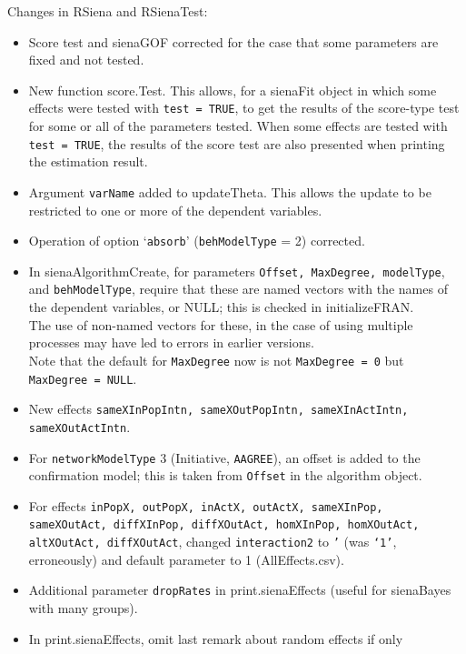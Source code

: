 \documentclass[a4paper,fleqn,11pt]{article}
\newcommand{\+}{\, + \,}
\newcommand{\sfn}[1]{\textsf{#1}}
\begin{document}
\begin{small}
\begin{itemize}
Changes in \textsf{RSiena} and \textsf{RSienaTest}:
\begin{itemize}
 \item Score test and \textsf{sienaGOF} corrected for the case that some parameters
      are fixed and not tested.
 \item New function \sfn{score.Test}. This allows, for a \sfn{sienaFit}
     object in which some effects were tested with \texttt{test = TRUE}, to get the
     results of the score-type test for some or all of the parameters tested.
     When some effects are tested with \texttt{test = TRUE}, the
     results of the score test are also presented when printing the estimation
     result.
 \item Argument \texttt{varName} added to \sfn{updateTheta}.
     This allows the update to be restricted to one or more of the
     dependent variables.
 \item Operation of option `\texttt{absorb}' (\texttt{behModelType} = 2) corrected.
 \item In \textsf{sienaAlgorithmCreate}, for parameters
     \texttt{Offset, MaxDegree, modelType},
     and \texttt{behModelType}, require that these are named vectors with the names
     of the dependent variables, or NULL; this is checked in \sfn{initializeFRAN}.\\
     The use of non-named vectors for these, in the case of using multiple processes
     may have led to errors in earlier versions.\\
     Note that the default for \texttt{MaxDegree} now is not \texttt{MaxDegree = 0}
     but \texttt{MaxDegree = NULL}.
 \item New effects \texttt{sameXInPopIntn, sameXOutPopIntn, sameXInActIntn,
     sameXOutActIntn}.
 \item For \texttt{networkModelType} 3 (Initiative, \texttt{AAGREE}),
     an offset is added to the
     confirmation model; this is taken from \texttt{Offset} in the algorithm object.
 \item For effects \texttt{inPopX, outPopX, inActX, outActX, sameXInPop, sameXOutAct,
     diffXInPop, diffXOutAct, homXInPop, homXOutAct, altXOutAct, diffXOutAct},
     changed \texttt{interaction2} to \texttt{'} (was \texttt{`1'}, erroneously)
     and default parameter to 1 (\sfn{AllEffects.csv}).
 \item Additional parameter \texttt{dropRates} in \sfn{print.sienaEffects}
    (useful for \textsf{sienaBayes} with many groups).
 \item In \sfn{print.sienaEffects}, omit last remark about random effects if only

\end{itemize}
\end{itemize}
\end{small}
\end{document}
